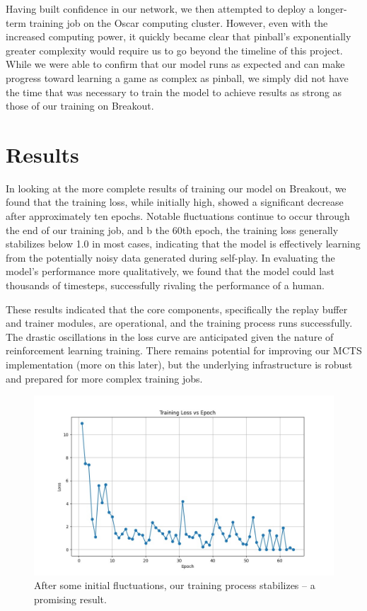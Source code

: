 \documentclass{article}
\begin{document}
Having built confidence in our network, we then attempted to deploy a longer-term training job on the Oscar computing cluster. However, even with the increased computing power, it quickly became clear that pinball's exponentially greater complexity would require us to go beyond the timeline of this project. While we were able to confirm that our model runs as expected and can make progress toward learning a game as complex as pinball, we simply did not have the time that was necessary to train the model to achieve results as strong as those of our training on Breakout.

\section{Results}
In looking at the more complete results of training our model on Breakout, we found that the training loss, while initially high, showed a significant decrease after approximately ten epochs. Notable fluctuations continue to occur through the end of our training job, and b the 60th epoch, the training loss generally stabilizes below 1.0 in most cases, indicating that the model is effectively learning from the potentially noisy data generated during self-play. In evaluating the model's performance more qualitatively, we found that the model could last thousands of timesteps, successfully rivaling the performance of a human.

These results indicated that the core components, specifically the replay buffer and trainer modules, are operational, and the training process runs successfully. The drastic oscillations in the loss curve are anticipated given the nature of reinforcement learning training. There remains potential for improving our MCTS implementation (more on this later), but the underlying infrastructure is robust and prepared for more complex training jobs.

\begin{figure}[H]
    \centering
    \includegraphics[width=1.0\textwidth]{loss_graph.jpeg}
    \caption{After some initial fluctuations, our training process stabilizes – a promising result.}
    \label{fig:loss_graph}
\end{figure}
\end{document}
